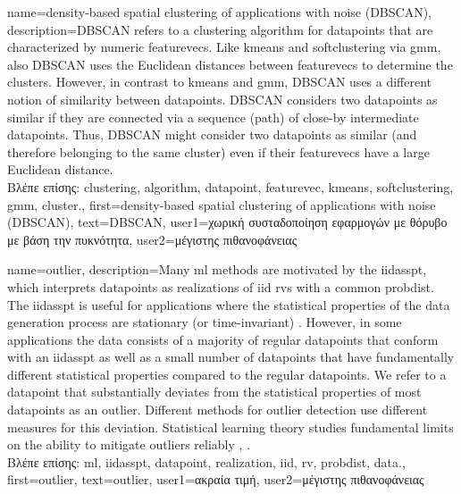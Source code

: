 {name={density-based spatial clustering of applications with noise (DBSCAN)}, 
	description={DBSCAN refers to a \gls{clustering} 
		\gls{algorithm} for \gls{datapoint}s that are characterized by numeric \gls{featurevec}s. 
		Like \gls{kmeans} and \gls{softclustering} via \gls{gmm}, also DBSCAN uses the Euclidean 
		distances between \gls{featurevec}s to determine the \gls{cluster}s. However, in contrast to \gls{kmeans} 
		and \gls{gmm}, DBSCAN uses a different notion of similarity between \gls{datapoint}s. 
		DBSCAN considers two \gls{datapoint}s as similar if they are connected 
		via a sequence (path) of close-by intermediate \gls{datapoint}s. Thus, DBSCAN might consider 
		two \gls{datapoint}s as similar (and therefore belonging to the same cluster) even if 
		their \gls{featurevec}s have a large Euclidean distance.\\
		\foreignlanguage{greek}{Βλέπε επίσης:} \gls{clustering}, \gls{algorithm}, \gls{datapoint}, \gls{featurevec}, \gls{kmeans}, \gls{softclustering}, \gls{gmm}, \gls{cluster}.},
	first={density-based spatial clustering of applications with noise (DBSCAN)},
	text={DBSCAN},
	user1={\foreignlanguage{greek}{χωρική συσταδοποίηση εφαρμογών με θόρυβο με βάση την πυκνότητα}}, %
  	user2={\foreignlanguage{greek}{μέγιστης πιθανοφάνειας}} %
}

{name={outlier}, 
	description={Many \gls{ml} methods 
		are motivated by the \gls{iidasspt}, which interprets \gls{datapoint}s as \gls{realization}s of 
		\gls{iid} \gls{rv}s with a common \gls{probdist}. The \gls{iidasspt} is useful for applications  
		where the statistical properties of the \gls{data} generation process are stationary (or time-invariant) \cite{Brockwell91}. 
		However, in some applications the \gls{data} consists of a majority of regular \gls{datapoint}s 
		that conform with an \gls{iidasspt} as well as a small number of \gls{datapoint}s that have fundamentally different 
        		statistical properties compared to the regular \gls{datapoint}s. We refer to a \gls{datapoint} that 
        		substantially deviates from the statistical properties of most \gls{datapoint}s as an 
        		outlier. Different methods for outlier detection use different measures for this deviation. 
        		Statistical learning theory studies fundamental limits on the ability to mitigate outliers reliably \cite{doi:10.1137/0222052}, \cite{10.1214/20-AOS1961}.\\
        \foreignlanguage{greek}{Βλέπε επίσης:} \gls{ml}, \gls{iidasspt}, \gls{datapoint}, \gls{realization}, \gls{iid}, \gls{rv}, \gls{probdist}, \gls{data}.},
	          first={outlier}, 
	          text={outlier},
	          user1={\foreignlanguage{greek}{ακραία τιμή}}, %
  		  user2={\foreignlanguage{greek}{μέγιστης πιθανοφάνειας}} %
}

